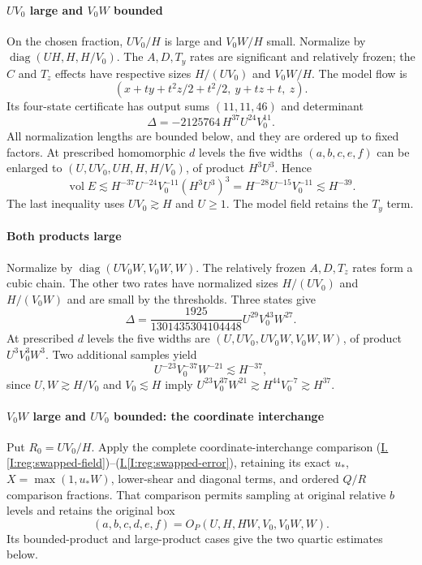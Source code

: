 \documentclass[11pt]{amsart}
\theoremstyle{definition}
\theoremstyle{remark}
\DeclareMathOperator{\vol}{vol}
\DeclareMathOperator{\diag}{diag}
\numberwithin{equation}{section}
\newcommand{\partIref}[1]{\hyperref[I:#1]{I.\ref*{I:#1}}}
\newcommand{\partIeqref}[1]{\textup{(\partIref{#1})}}
\begin{document}
\paragraph{\texorpdfstring{$UV_0$ large and $V_0W$ bounded}{UV large and VW bounded}}
On the chosen fraction, $UV_0/H$ is large and $V_0W/H$ small. Normalize by $\diag(UH,H,H/V_0)$. The $A,D,T_y$ rates are significant and relatively frozen; the $C$ and $T_z$ effects have respective sizes $H/(UV_0)$ and $V_0W/H$. The model flow is
\[
(x+t y+t^2z/2+t^2/2,\ y+t z+t,\ z).
\]
Its four-state certificate has output sums $(11,11,46)$ and determinant
\[
\Delta=-2125764\,H^{37}U^{24}V_0^{11}.
\]
All normalization lengths are bounded below, and they are ordered up to fixed factors. At prescribed homomorphic $d$ levels the five widths $(a,b,c,e,f)$ can be enlarged to $(U,UV_0,UH,H,H/V_0)$, of product $H^3U^3$. Hence
\[
\vol E\lesssim H^{-37}U^{-24}V_0^{-11}(H^3U^3)^3
=H^{-28}U^{-15}V_0^{-11}\lesssim H^{-39}.
\]
The last inequality uses $UV_0\gtrsim H$ and $U\ge1$. The model field retains the $T_y$ term.

\paragraph{Both products large}
Normalize by $\diag(UV_0W,V_0W,W)$. The relatively frozen $A,D,T_z$ rates form a cubic chain. The other two rates have normalized sizes $H/(UV_0)$ and $H/(V_0W)$ and are small by the thresholds. Three states give
\[
\Delta=\frac{1925}{1301435304104448}U^{29}V_0^{43}W^{27}.
\]
At prescribed $d$ levels the five widths are $(U,UV_0,UV_0W,V_0W,W)$, of product $U^3V_0^3W^3$. Two additional samples yield
\[
U^{-23}V_0^{-37}W^{-21}\lesssim H^{-37},
\]
since $U,W\gtrsim H/V_0$ and $V_0\lesssim H$ imply $U^{23}V_0^{37}W^{21}\gtrsim H^{44}V_0^{-7}\gtrsim H^{37}$.

\paragraph{\texorpdfstring{$V_0W$ large and $UV_0$ bounded: the coordinate interchange}{VW large and UV bounded: the coordinate interchange}}\label{low:4:rr:swap}
Put $R_0=UV_0/H$. Apply the complete coordinate-interchange comparison \partIeqref{reg:swapped-field}--\partIeqref{reg:swapped-error}, retaining its exact $u_*$, $X=\max(1,u_*W)$, lower-shear and diagonal terms, and ordered $Q/R$ comparison fractions. That comparison permits sampling at original relative $b$ levels and retains the original box
\[
(a,b,c,d,e,f)=O_P(U,H,HW,V_0,V_0W,W).
\]
Its bounded-product and large-product cases give the two quartic estimates below.
\end{document}
